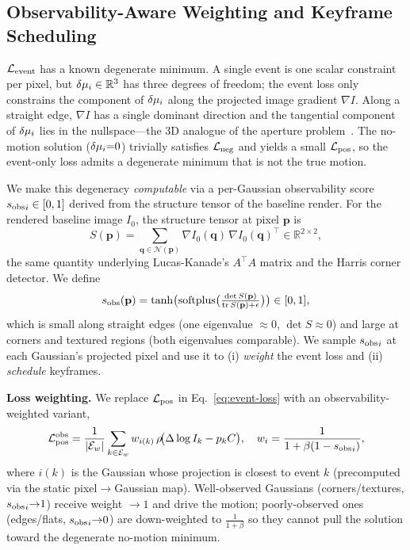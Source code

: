 \subsection{Observability-Aware Weighting and Keyframe Scheduling}
\label{sec:obs}
$\mathcal{L}_{\text{event}}$ has a known degenerate minimum. A single event is one scalar constraint per pixel, but $\delta\mu_i\in\mathbb{R}^3$ has three degrees of freedom; the event loss only constrains the component of $\delta\mu_i$ along the projected image gradient $\nabla I$. Along a straight edge, $\nabla I$ has a single dominant direction and the tangential component of $\delta\mu_i$ lies in the nullspace---the 3D analogue of the aperture problem~\cite{barron1994aperture}. The no-motion solution ($\delta\mu_i{=}0$) trivially satisfies $\mathcal{L}_{\text{neg}}$ and yields a small $\mathcal{L}_{\text{pos}}$, so the event-only loss admits a degenerate minimum that is not the true motion.

We make this degeneracy \emph{computable} via a per-Gaussian observability score ${s_{\mathrm{obs}}}_i\in[0,1]$ derived from the structure tensor of the baseline render. For the rendered baseline image $I_0$, the structure tensor at pixel $\mathbf{p}$ is
\begin{equation}
  S(\mathbf{p}) = \sum_{\mathbf{q}\in\mathcal{N}(\mathbf{p})} \nabla I_0(\mathbf{q})\,\nabla I_0(\mathbf{q})^\top \in \mathbb{R}^{2\times 2},
  \label{eq:structure-tensor}
\end{equation}
the same quantity underlying Lucas-Kanade's $A^\top A$ matrix and the Harris corner detector. We define
\begin{equation}
  {s_{\mathrm{obs}}}(\mathbf{p}) = \tanh\!\big(\mathrm{softplus}\big(\tfrac{\det S(\mathbf{p})}{\mathrm{tr}\,S(\mathbf{p})+\epsilon}\big)\big) \in [0,1],
  \label{eq:obs-score}
\end{equation}
which is small along straight edges (one eigenvalue $\approx 0$, $\det S\approx 0$) and large at corners and textured regions (both eigenvalues comparable). We sample ${s_{\mathrm{obs}}}_i$ at each Gaussian's projected pixel and use it to (i) \emph{weight} the event loss and (ii) \emph{schedule} keyframes.

\medskip\noindent\textbf{Loss weighting.} We replace $\mathcal{L}_{\text{pos}}$ in Eq.~\ref{eq:event-loss} with an observability-weighted variant,
\begin{equation}
  \mathcal{L}_{\text{pos}}^{\text{obs}} = \frac{1}{|\mathcal{E}_w|}\sum_{k\in\mathcal{E}_w} w_{i(k)}\,\rho\!\big(\Delta\log I_k - p_k C\big),\quad
  w_i = \frac{1}{1 + \beta(1-{s_{\mathrm{obs}}}_i)},
  \label{eq:obs-weight}
\end{equation}
where $i(k)$ is the Gaussian whose projection is closest to event $k$ (precomputed via the static pixel$\to$Gaussian map). Well-observed Gaussians (corners/textures, ${s_{\mathrm{obs}}}_i{\to}1$) receive weight $\to 1$ and drive the motion; poorly-observed ones (edges/flats, ${s_{\mathrm{obs}}}_i{\to}0$) are down-weighted to $\tfrac{1}{1+\beta}$ so they cannot pull the solution toward the degenerate no-motion minimum.

